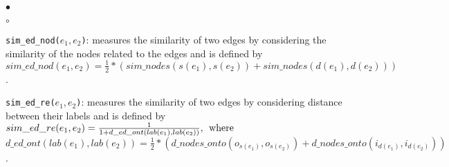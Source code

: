 \documentclass{new_tlp}
\begin{document}
{\begin{list}{$\bullet$}{\itemsep=0pt \parsep=1pt \topsep=1pt \leftmargin=10pt}
\begin{list}{$\circ$}{\itemsep=0pt \topsep=1pt \parsep=1pt \leftmargin=10pt}
	\item \texttt{sim\_ed\_nod($e_{1},e_{2}$)}: measures the similarity of two edges by considering the similarity of the nodes related to the edges and is defined by \\
			$sim\_ed\_nod(e_{1},e_{2}) = \frac{1}{2}*(sim\_nodes(s(e_1),s(e_2)) + sim\_nodes(d(e_{1}), d(e_{2})))$.
 
	\item \texttt{sim\_ed\_re($e_1,e_2$)}:  measures the similarity of two edges by considering distance between their labels
	and is defined by \\
			$sim\_ed\_re(e_{1},e_{2}) = \frac{1}{1 + d\_ed\_ont(lab(e_{1}),lab(e_{2}))}, \:\: \textnormal{where}$ 
	            $
                      d\_ed\_ont(lab(e_{1}),lab(e_{2})) = \frac{1}{2} *(d\_nodes\_onto(o_{s(e_1)} ,o_{s(e_2)}) + d\_nodes\_onto(i_{d(e_1)},i_{d(e_2)}))                                                                    
                      $.	
			

\end{list}
\end{list}}
\end{document}

